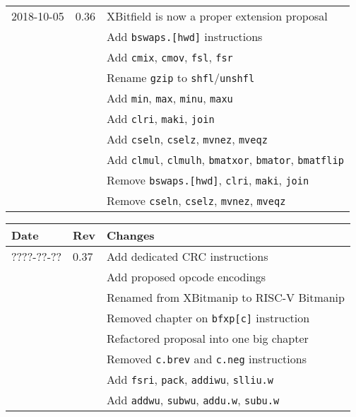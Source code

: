 \documentclass[twoside,11pt]{book}
\begin{document}
\begin{center}
\begin{tabular}{lll}
2018-10-05 & 0.36 & XBitfield is now a proper extension proposal \\
           &      & Add {\tt bswaps.[hwd]} instructions \\
           &      & Add {\tt cmix}, {\tt cmov}, {\tt fsl}, {\tt fsr} \\
           &      & Rename {\tt gzip} to {\tt shfl}/{\tt unshfl} \\
           &      & Add {\tt min}, {\tt max}, {\tt minu}, {\tt maxu} \\
           &      & Add {\tt clri}, {\tt maki}, {\tt join} \\
           &      & Add {\tt cseln}, {\tt cselz}, {\tt mvnez}, {\tt mveqz} \\
           &      & Add {\tt clmul}, {\tt clmulh}, {\tt bmatxor}, {\tt bmator}, {\tt bmatflip} \\
           &      & Remove {\tt bswaps.[hwd]}, {\tt clri}, {\tt maki}, {\tt join} \\
           &      & Remove {\tt cseln}, {\tt cselz}, {\tt mvnez}, {\tt mveqz}
\end{tabular}
\end{center}

\begin{center}
\begin{tabular}{lll}
Date & Rev & Changes \\
\hline
????-??-?? & 0.37 & Add dedicated CRC instructions \\
           &      & Add proposed opcode encodings \\
           &      & Renamed from XBitmanip to RISC-V Bitmanip \\
           &      & Removed chapter on {\tt bfxp[c]} instruction \\
           &      & Refactored proposal into one big chapter \\
           &      & Removed {\tt c.brev} and {\tt c.neg} instructions \\
           &      & Add {\tt fsri}, {\tt pack}, {\tt addiwu}, {\tt slliu.w} \\
           &      & Add {\tt addwu}, {\tt subwu}, {\tt addu.w}, {\tt subu.w}
\end{tabular}
\end{center}



\end{document}

